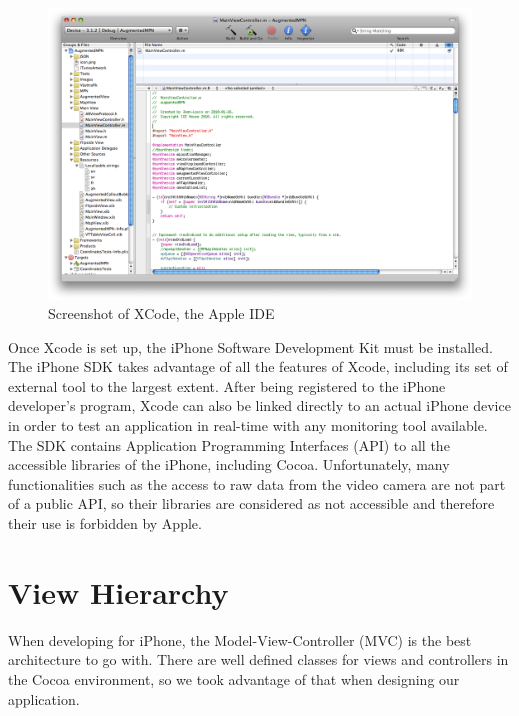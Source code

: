 \begin{figure}[ht]
\center
\includegraphics[scale=0.3]{pics/xcode}
\caption{Screenshot of XCode, the Apple IDE}
\label{fig:client_view_hierarchy}
\end{figure}

Once Xcode is set up, the iPhone Software Development Kit must be installed. The iPhone SDK takes advantage of all the features of Xcode, including its set of external tool to the largest extent. After being registered to the iPhone developer's program, Xcode can also be linked directly to an actual iPhone device in order to test an application in real-time with any monitoring tool available.\\

The SDK contains Application Programming Interfaces (API) to all the accessible libraries of the iPhone, including Cocoa. Unfortunately, many functionalities such as the access to raw data from the video camera are not part of a public API, so their libraries are considered as not accessible and therefore their use is forbidden by Apple.

\section{View Hierarchy}

When developing for iPhone, the Model-View-Controller (MVC) is the best architecture to go with. There are well defined classes for views and controllers in the Cocoa environment, so we took advantage of that when designing our application.\\

